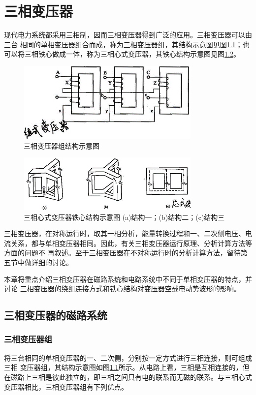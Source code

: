 \documentclass{book}
\begin{document}
\chapter{三相变压器}
现代电力系统都采用三相制，因而三相变压器得到广泛的应用。三相变压器可以由三台 相同的单相变压器组合而成，称为三相变压器组，其结构示意图见图\ref{fig_4.1}；也可以将三相铁心做成一体，称为三相心式变压器，其铁心结构示意图见图\ref{fig_4.2}。
\begin{figure}[H]
	\centering
	\includegraphics[width=0.80\textwidth]{4-1.png}
	\caption{三相变压器组结构示意图}
	\label{fig_4.1}
\end{figure}
\begin{figure}[H]
	\centering
	\includegraphics[width=0.80\textwidth]{4-2.png}
	\caption{三相心式变压器铁心结构示意图
		(a)结构一；(b)结构二；(c)结构三}
	\label{fig_4.2}
\end{figure}

三相变压器，在对称运行时，取其一相分析，能量转换过程和一、二次侧电压、电流关系，都与单相变压器相同。因此，有关三相变压器运行原理、分析计算方法等方面的问题不 再叙述。至于三相变压器在不对称运行时的分析计算方法，留待第五节中做详细的讨论。

本章将重点介绍三相变压器在磁路系统和电路系统中不同于单相变压器的特点，并讨论 三相变压器的绕组连接方式和铁心结构对变压器空载电动势波形的影响。

\section{三相变压器的磁路系统}

\subsection{三相变压器组}
将三台相同的单相变压器的一、二次侧，分别按一定方式进行三相连接，则可组成三相 变压器组，其结构示意图如图\ref{fig_4.1}所示。从电路上看，三相是互相连接的，但在磁路上三相是彼此独立的，即三相之间只有电的联系而无磁的联系。与三相心式变压器相比，三相变压器组有下列优点。
\end{document}
